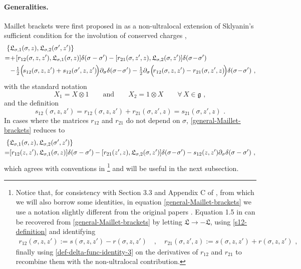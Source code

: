 \documentclass[12pt]{article}
\numberwithin{equation}{section}
\begin{document}
\paragraph{Generalities.} Maillet brackets were first proposed in \cite{MAILLET198654,Maillet:1985ec} as a non-ultralocal extension of Sklyanin's sufficient condition for the involution of conserved charges \cite{Sklyanin:1980ij},
\begin{align}\label{general-Maillet-brackets}
\{ & \mathfrak{L}_{\sigma,1}(\sigma,z),\mathfrak{L}_{\sigma,2}(\sigma',z') \}
\notag \\
=&\!+\![r_{12}(\sigma,z,z'),\mathfrak{L}_{\sigma,1}(\sigma,z)]\delta(\sigma-\sigma')-[r_{21}(\sigma,z',z),\mathfrak{L}_{\sigma,2}(\sigma,z')]\delta(\sigma\!-\!\sigma')
\\
&\!-\!\tfrac{1}{2}\Bigl(\! s_{12}(\sigma,z,z')+s_{12}(\sigma',z,z') \!\Bigr)\partial_{\sigma}\delta(\sigma\!-\!\sigma')-\tfrac{1}{2}\partial_{\sigma}\Bigl( \!r_{12}(\sigma,z,z')-r_{21}(\sigma,z',z) \! \Bigr)\delta(\sigma\!-\!\sigma') \,\, , 
\notag 
\end{align}
with the standard notation
\begin{equation}
X_{1}=X\otimes \mathrm{1}
\qquad \text{and} \qquad 
X_{2}=\mathrm{1}\otimes X \qquad \forall \, X \in \mathfrak{g}\,\, ,
\end{equation}
and the definition
\begin{equation}\label{s12-definition}
s_{12}(\sigma,z,z')=r_{12}(\sigma,z,z')+r_{21}(\sigma,z',z)=s_{21}(\sigma,z',z)\,\, .
\end{equation}
In cases where the matrices $r_{12}$ and $r_{21}$ do not depend on $\sigma$, \eqref{general-Maillet-brackets} reduces to 
\begin{align}\label{sigma-independent-Maillet-bracket}
\{ & \mathfrak{L}_{\sigma,1}(\sigma,z),\mathfrak{L}_{\sigma,2}(\sigma',z') \}
\\
=&[r_{12}(z,z'),\mathfrak{L}_{\sigma,1}(\sigma,z)]\delta(\sigma-\sigma')-[r_{21}(z',z),\mathfrak{L}_{\sigma,2}(\sigma,z')]\delta(\sigma\!-\!\sigma')-s_{12}(z,z')\partial_{\sigma}\delta(\sigma-\sigma') \,\, ,
\notag
\end{align}
which agrees with conventions in \cite{Bielli:2024ach}\footnote{Notice that, for consistency with Section 3.3 and Appendix C of \cite{Bielli:2024ach}, from which we will also borrow some identities, in equation \eqref{general-Maillet-brackets} we use a notation slightly different from the original papers \cite{MAILLET198654,Maillet:1985ec}. Equation 1.5 in \cite{MAILLET198654} can be recovered from \eqref{general-Maillet-brackets} by letting $\mathfrak{L}\rightarrow-\mathfrak{L}$, using \eqref{s12-definition} and identifying
\begin{equation}\label{our-choice-of-r12}
\begin{aligned}
r_{12}(\sigma,z,z'):=s(\sigma,z,z')-r(\sigma,z,z')
\quad , \quad 
r_{21}(\sigma,z',z):=s(\sigma,z,z')+r(\sigma,z,z') \,\, ,
\end{aligned}
\end{equation}
finally using \eqref{def-delta-func-identity-3} on the derivatives of $r_{12}$ and $r_{21}$ to recombine them with the non-ultralocal contribution.} and will be useful in the next subsection.
\end{document}
